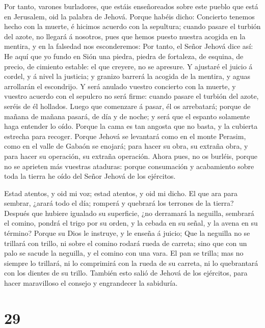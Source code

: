  Por tanto, varones burladores, que estáis enseñoreados
sobre este pueblo que está en Jerusalem, oid la palabra de Jehová.
 Porque habéis dicho: Concierto tenemos hecho con la
muerte, é hicimos acuerdo con la sepultura; cuando pasare el turbión del
azote, no llegará á nosotros, pues que hemos puesto nuestra acogida en
la mentira, y en la falsedad nos esconderemos:  Por tanto,
el Señor Jehová dice así: He aquí que yo fundo en Sión una piedra,
piedra de fortaleza, de esquina, de precio, de cimiento estable: el que
creyere, no se apresure.  Y ajustaré el juicio á cordel, y
á nivel la justicia; y granizo barrerá la acogida de la mentira, y aguas
arrollarán el escondrijo.  Y será anulado vuestro concierto
con la muerte, y vuestro acuerdo con el sepulcro no será firme: cuando
pasare el turbión del azote, seréis de él hollados.  Luego
que comenzare á pasar, él os arrebatará; porque de mañana de mañana
pasará, de día y de noche; y será que el espanto solamente haga entender
lo oído.  Porque la cama es tan angosta que no basta, y la
cubierta estrecha para recoger.  Porque Jehová se levantará
como en el monte Perasim, como en el valle de Gabaón se enojará; para
hacer su obra, su extraña obra, y para hacer su operación, su extraña
operación.  Ahora pues, no os burléis, porque no se
aprieten más vuestras ataduras: porque consumación y acabamiento sobre
toda la tierra he oído del Señor Jehová de los ejércitos.

 Estad atentos, y oid mi voz; estad atentos, y oid mi
dicho.  El que ara para sembrar, ¿arará todo el día;
romperá y quebrará los terrones de la tierra?  Después que
hubiere igualado su superficie, ¿no derramará la neguilla, sembrará el
comino, pondrá el trigo por su orden, y la cebada en su señal, y la
avena en su término?  Porque su Dios le instruye, y le
enseña á juicio;  Que la neguilla no se trillará con
trillo, ni sobre el comino rodará rueda de carreta; sino que con un palo
se sacude la neguilla, y el comino con una vara.  El pan se
trilla; mas no siempre lo trillará, ni lo comprimirá con la rueda de su
carreta, ni lo quebrantará con los dientes de su trillo. 
También esto salió de Jehová de los ejércitos, para hacer maravilloso el
consejo y engrandecer la sabiduría.

\hypertarget{section-28}{%
\section{29}\label{section-28}}

